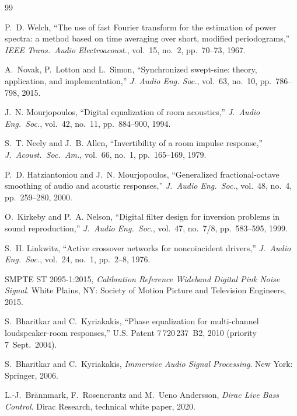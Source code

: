 \documentclass[10pt,a4paper]{article}
\begin{document}
\begin{thebibliography}{99}

P.~D. Welch, ``The use of fast Fourier transform for the estimation of
power spectra: a method based on time averaging over short, modified
periodograms,'' \textit{IEEE Trans.\ Audio Electroacoust.},
vol.~15, no.~2, pp.~70--73, 1967.

A.~Novak, P.~Lotton and L.~Simon, ``Synchronized swept-sine: theory,
application, and implementation,'' \textit{J. Audio Eng. Soc.},
vol.~63, no.~10, pp.~786--798, 2015.

J.~N. Mourjopoulos, ``Digital equalization of room acoustics,''
\textit{J.\ Audio Eng.\ Soc.}, vol.~42, no.~11, pp.~884--900, 1994.

S.~T. Neely and J.~B. Allen, ``Invertibility of a room impulse
response,'' \textit{J.\ Acoust.\ Soc.\ Am.}, vol.~66, no.~1,
pp.~165--169, 1979.

P.~D. Hatziantoniou and J.~N. Mourjopoulos, ``Generalized
fractional-octave smoothing of audio and acoustic responses,''
\textit{J.\ Audio Eng.\ Soc.}, vol.~48, no.~4, pp.~259--280, 2000.

O.~Kirkeby and P.~A. Nelson, ``Digital filter design for inversion
problems in sound reproduction,'' \textit{J.\ Audio Eng.\ Soc.},
vol.~47, no.~7/8, pp.~583--595, 1999.

S.~H. Linkwitz, ``Active crossover networks for noncoincident drivers,''
\textit{J.\ Audio Eng.\ Soc.}, vol.~24, no.~1, pp.~2--8, 1976.

SMPTE ST 2095-1:2015, \textit{Calibration Reference Wideband Digital Pink
Noise Signal}. White Plains, NY: Society of Motion Picture and Television
Engineers, 2015.

S.~Bharitkar and C.~Kyriakakis, ``Phase equalization for multi-channel
loudspeaker-room responses,'' U.S. Patent 7\,720\,237~B2, 2010
(priority 7~Sept.\ 2004).

S.~Bharitkar and C.~Kyriakakis, \textit{Immersive Audio Signal Processing}.
New York: Springer, 2006.

L.-J.~Br\"annmark, F.~Rosencrantz and M.~Ueno Andersson, \textit{Dirac Live
Bass Control}. Dirac Research, technical white paper, 2020.


\end{thebibliography}
\end{document}
